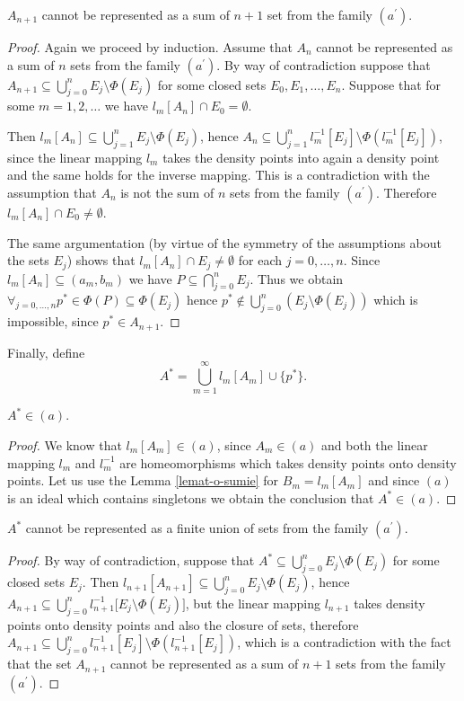 \documentclass[12pt]{amsart}
\theoremstyle{plain}
\theoremstyle{definition}
\theoremstyle{remark}
\newcommand{\aideal}{\mathit{(a)}}
\newcommand{\aidealprime}{\mathit{(a^\prime)}}
\begin{document}
 $A_{n+1}$ cannot be represented
as a sum of $n + 1$ set from the family $\aidealprime$.
\begin{proof}
  Again we proceed by induction. Assume that $A_n$
cannot be represented as a sum of 
$n$ sets from the family $\aidealprime$.
By way of contradiction suppose that
$A_{n+1} \subseteq \bigcup_{j=0}^n E_j \setminus \Phi(E_j)$
for some closed sets $E_0, E_1, \ldots, E_n$.
Suppose that for some  
$m = 1,2,\ldots$ we have $l_m[A_n] \cap E_0 = \emptyset$.

Then $l_m[A_n] \subseteq \bigcup_{j=1}^n E_j \setminus \Phi(E_j)$, hence
$A_n \subseteq \bigcup_{j=1}^n l_m^{-1}[E_j] \setminus \Phi(l_m^{-1}[E_j])$,
since the linear mapping $l_m$ takes the density points
into again a density point and the same holds for the
inverse mapping. This is a contradiction with the assumption
that $A_n$ is not the sum of $n$ sets from the family
$\aidealprime$.
Therefore $l_m[A_n] \cap E_0 \not= \emptyset$.

The same argumentation (by virtue of the symmetry of
the assumptions about the sets $E_j$)
shows that $l_m[A_n] \cap E_j \not= \emptyset$
for each $j = 0, \ldots, n$.
Since $l_m[A_n] \subseteq (a_m, b_m)$ we have
$P \subseteq \bigcap_{j=0}^n E_j$. 
Thus we obtain $\forall_{j=0,\ldots, n} p^* \in \Phi(P) \subseteq \Phi(E_j)$
hence $p^* \not\in \bigcup_{j=0}^n (E_j \setminus \Phi(E_j))$
which is impossible, since $p^* \in A_{n+1}$.
\end{proof}


Finally, define 
\[ A^* = \bigcup_{m=1}^{\infty} l_m[A_m] \cup \lbrace p^* \rbrace.
\]

 $A^* \in \aideal$.
\begin{proof}
We know that $l_m[A_m] \in \aideal$, since
$A_m \in \aideal$ and both the linear mapping $l_m$
and $l_m^{-1}$ are homeomorphisms which
takes density points onto density points.
Let us use the Lemma \ref{lemat-o-sumie} for
$B_m = l_m[A_m]$ and since $\aideal$ is an ideal
which contains singletons we obtain the conclusion that 
$A^* \in \aideal$.
\end{proof}

 $A^*$ cannot be represented
as a finite union of sets from the family $\aidealprime$.
\begin{proof}
By way of contradiction, suppose that
$A^* \subseteq \bigcup_{j=0}^n E_j \setminus \Phi(E_j)$
for some closed sets $E_j$.
Then
$l_{n+1}[A_{n+1}] \subseteq \bigcup_{j=0}^n E_j \setminus \Phi(E_j)$,
hence
$A_{n+1} \subseteq \bigcup_{j=0}^n l_{n+1}^{-1}\big[E_j \setminus \Phi(E_j)\big]$,
but the linear mapping $l_{n+1}$
takes density points onto density points and also
the closure of sets, therefore
$A_{n+1} \subseteq \bigcup_{j=0}^n l_{n+1}^{-1}[E_j] \setminus
\Phi(l_{n+1}^{-1}[E_j])$, which is a contradiction
with the fact that the set 
$A_{n+1}$ cannot be represented as a sum of $n+1$
sets from the family $\aidealprime$.
\end{proof}
\end{document}
